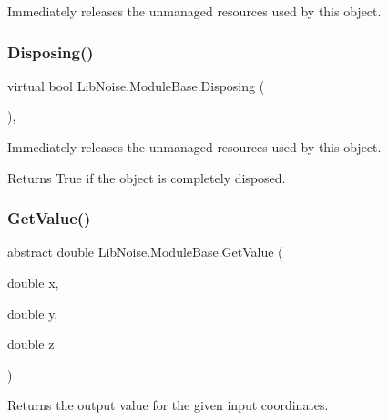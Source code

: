 Immediately releases the unmanaged resources used by this object. 

\mbox{\label{class_lib_noise_1_1_module_base_a564dbb55fb2a28d5dc7798849508ab2b}} 
\subsubsection{\texorpdfstring{Disposing()}{Disposing()}}
{\footnotesize\ttfamily virtual bool Lib\+Noise.\+Module\+Base.\+Disposing (\begin{DoxyParamCaption}{ }\end{DoxyParamCaption})\hspace{0.3cm}{\ttfamily [protected]}, {\ttfamily [virtual]}}



Immediately releases the unmanaged resources used by this object. 

\begin{DoxyReturn}{Returns}
True if the object is completely disposed.
\end{DoxyReturn}
\mbox{\label{class_lib_noise_1_1_module_base_abb3f06725165dc1fda63de23b68f408b}} 
\subsubsection{\texorpdfstring{Get\+Value()}{GetValue()}\hspace{0.1cm}{\footnotesize\ttfamily [1/3]}}
{\footnotesize\ttfamily abstract double Lib\+Noise.\+Module\+Base.\+Get\+Value (\begin{DoxyParamCaption}\item[{double}]{x,  }\item[{double}]{y,  }\item[{double}]{z }\end{DoxyParamCaption})\hspace{0.3cm}{\ttfamily [pure virtual]}}



Returns the output value for the given input coordinates. 



